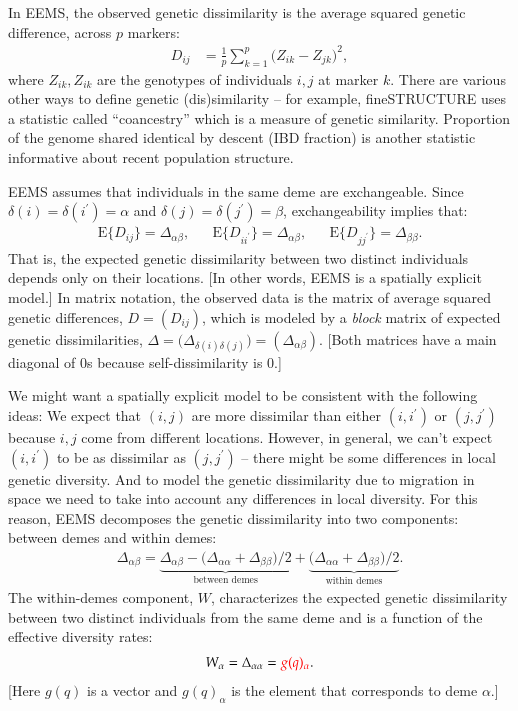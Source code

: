 \documentclass[a4paper,10pt,DIV=15,titlepage,mpinclude=true]{scrartcl}
\newcommand{\specialrm}[1]{\mathrm{#1}}
\providecommand{\E}{\specialrm{E}}
\begin{document}
In EEMS, the observed genetic dissimilarity is the average squared genetic difference, across $p$ markers:
\begin{align}
D_{ij}&=\frac{1}{p}\sum_{k=1}^p\big(Z_{ik}-Z_{jk}\big)^2,
\end{align}
where $Z_{ik},Z_{ik}$ are the genotypes of individuals $i,j$ at marker $k$. There are various other ways to define genetic (dis)similarity -- for example, fineSTRUCTURE uses a statistic called ``coancestry'' which is a measure of genetic similarity. Proportion of the genome shared identical by descent (IBD fraction) is another statistic informative about recent population structure. %

EEMS assumes that individuals in the same deme are exchangeable. Since $\delta(i) = \delta(i^\prime) = \alpha$ and $\delta(j) = \delta(j^\prime) = \beta$, exchangeability implies that:
\begin{align}
\E\big\{D_{ij}\big\} = \Delta_{\alpha\beta},&&
\E\big\{D_{ii^\prime}\big\} = \Delta_{\alpha\beta},&&
\E\big\{D_{jj^\prime}\big\} = \Delta_{\beta\beta}.
\end{align}
That is, the expected genetic dissimilarity between two distinct individuals depends only on their locations. [In other words, EEMS is a spatially explicit model.] In matrix notation, the observed data is the matrix of average squared genetic differences, $D=(D_{ij})$, which is modeled by a \textit{block} matrix of expected genetic dissimilarities, $\Delta=\big(\Delta_{\delta(i)\delta(j)}\big)=(\Delta_{\alpha\beta})$. [Both matrices have a main diagonal of 0s because self-dissimilarity is 0.]

We might want a spatially explicit model to be consistent with the following ideas: We expect that $(i,j)$ are more dissimilar than either $(i,i^\prime)$ or $(j,j^\prime)$ because $i,j$ come from different locations. However, in general, we can't expect $(i,i^\prime)$ to be as dissimilar as $(j,j^\prime)$ -- there might be some differences in local genetic diversity. And to model the genetic dissimilarity due to migration in space we need to take into account any differences in local diversity. For this reason, EEMS decomposes the genetic dissimilarity into two components: between demes and within demes:
\begin{align}
\Delta_{\alpha\beta} = \underbrace{\Delta_{\alpha\beta} - \big(\Delta_{\alpha\alpha}+\Delta_{\beta\beta}\big)/2}_{\text{between demes}} + \underbrace{\big(\Delta_{\alpha\alpha}+\Delta_{\beta\beta}\big)/2}_{\text{within demes}}.
\end{align}
The within-demes component, $W$, characterizes the expected genetic dissimilarity between two distinct individuals from the same deme and is a function of the effective diversity rates:
\begin{align}
W_\alpha = \Delta_{\alpha\alpha} = {\color{red} g(q)_\alpha}.
\end{align}
[Here $g(q)$ is a vector and $g(q)_\alpha$ is the element that corresponds to deme $\alpha$.]
\end{document}
